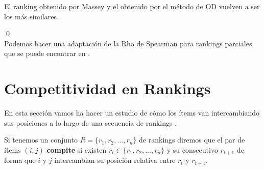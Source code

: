 	El ranking obtenido por Massey y el obtenido por el método de OD vuelven a ser los más similares.
	
\qed
\ \\
Podemos hacer una adaptación de la Rho de Spearman para rankings parciales que se puede encontrar en \cite[pág 207-211]{cap16}.

\section{Competitividad en Rankings}
En esta sección vamos ha hacer un estudio de cómo los ítems van intercambiando sus posiciones a lo largo de una secuencia de rankings \cite{refcomp}.\\

\begin{defi} Si tenemos un conjunto $R=\{r_{1},r_{2},\dots,r_{n}\}$ de rankings diremos que el par de ítems $(i,j)$ \textbf{compite} si existen $r_{t} \in \{r_{1},r_{2},\dots,r_{n}\}$ y su consecutivo $r_{t+1}$ de forma que $i$ y $j$ intercambian su posición relativa entre $r_{t}$ y $r_{t+1}$.
\end{defi}

